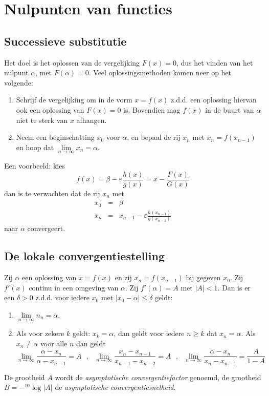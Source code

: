 \documentclass[twoside]{report}
\begin{document}
\section{Nulpunten van functies}
\subsection{Successieve substitutie}
Het doel is het oplossen van de vergelijking $F(x)=0$, dus het vinden van het
nulpunt $\alpha$, met $F(\alpha)=0$.
\npar
Veel oplossingsmethoden komen neer op het volgende:
\begin{enumerate}
\item Schrijf de vergelijking om in de vorm $x=f(x)$ z.d.d. een oplossing
      hiervan ook een oplossing van $F(x)=0$ is. Bovendien mag $f(x)$ in de
      buurt van $\alpha$ niet te sterk van $x$ afhangen.
\item Neem een beginschatting $x_0$ voor $\alpha$, en bepaal de rij $x_n$
      met $x_n=f(x_{n-1})$ en hoop dat $\lim\limits_{n\rightarrow\infty}x_n=\alpha$.
\end{enumerate}
Een voorbeeld: kies
\[
f(x)=\beta-\varepsilon\frac{h(x)}{g(x)}=x-\frac{F(x)}{G(x)}
\]
dan is te verwachten dat de rij $x_n$ met
\begin{eqnarray*}
x_0&=&\beta\\
x_n&=&x_{n-1}-\varepsilon\frac{h(x_{n-1})}{g(x_{n-1})}
\end{eqnarray*}
naar $\alpha$ convergeert.

\subsection{De lokale convergentiestelling}
Zij $\alpha$ een oplossing van $x=f(x)$ en zij $x_n=f(x_{n-1})$ bij gegeven
$x_0$. Zij $f'(x)$ continu in een omgeving van $\alpha$. Zij $f'(\alpha)=A$
met $|A|<1$. Dan is er een $\delta>0$ z.d.d. voor iedere
$x_0$ met $|x_0-\alpha|\leq\delta$ geldt:
\begin{enumerate}
\item $\lim\limits_{n\rightarrow\infty}n_n=\alpha$,
\item Als voor zekere $k$ geldt: $x_k=\alpha$, dan geldt voor iedere $n\geq k$
      dat $x_n=\alpha$. Als $x_n\neq\alpha$ voor alle $n$ dan geldt
\[
\lim_{n\rightarrow\infty}\frac{\alpha-x_n}{\alpha-x_{n-1}}=A~~~,~~~
\lim_{n\rightarrow\infty}\frac{x_n-x_{n-1}}{x_{n-1}-x_{n-2}}=A~~~,~~~
\lim_{n\rightarrow\infty}\frac{\alpha-x_n}{x_n-x_{n-1}}=\frac{A}{1-A}
\]
\end{enumerate}
De grootheid $A$ wordt de {\it asymptotische convergentiefactor} genoemd, de
grootheid $B=-{}^{10}\log|A|$ de {\it asymptotische convergentiesnelheid}.
\end{document}
